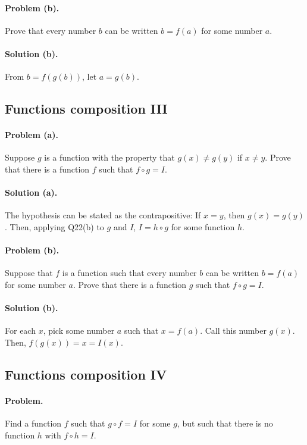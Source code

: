 \documentclass{article}
\begin{document}
\paragraph{Problem (b).} Prove that every number $b$ can be written $b = f(a)$ for some number $a$.

\paragraph{Solution (b).} From $b = f(g(b))$, let $a = g(b)$.

\setcounter{subsection}{23}
\subsection{Functions composition III}

\paragraph{Problem (a).} Suppose $g$ is a function with the property that $g(x) \neq g(y)$ if $x \neq y$. Prove that there is a function $f$ such that $f \circ g = I$.

\paragraph{Solution (a).} The hypothesis can be stated as the contrapositive: If $x = y$, then $g(x) = g(y)$. Then, applying Q22(b) to $g$ and $I$, $I = h \circ g$ for some function $h$.

\paragraph{Problem (b).} Suppose that $f$ is a function such that every number $b$ can be written $b = f(a)$ for some number $a$. Prove that there is a function $g$ such that $f \circ g = I$.

\paragraph{Solution (b).} For each $x$, pick some number $a$ such that $x = f(a)$. Call this number $g(x)$. Then, $f(g(x)) = x = I(x)$.

\setcounter{subsection}{24}
\subsection{Functions composition IV}

\paragraph{Problem.} Find a function $f$ such that $g \circ f = I$ for some $g$, but such that there is no function $h$ with $f \circ h = I$.
\end{document}
